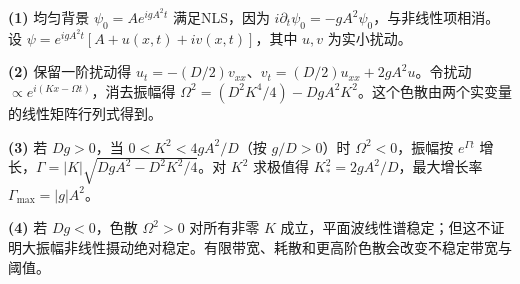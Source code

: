 \par\noindent\textbf{(1)} 均匀背景 \(\psi_0=Ae^{igA^2t}\) 满足NLS，因为 \(i\partial_t\psi_0=-gA^2\psi_0\)，与非线性项相消。设 \(\psi=e^{igA^2t}[A+u(x,t)+iv(x,t)]\)，其中 \(u,v\) 为实小扰动。
\par\noindent\textbf{(2)} 保留一阶扰动得 \(u_t=-(D/2)v_{xx}\)、\(v_t=(D/2)u_{xx}+2gA^2u\)。令扰动 \(\propto e^{i(Kx-\Omega t)}\)，消去振幅得 \(\Omega^2=(D^2K^4/4)-DgA^2K^2\)。这个色散由两个实变量的线性矩阵行列式得到。
\par\noindent\textbf{(3)} 若 \(Dg>0\)，当 \(0<K^2<4gA^2/D\)（按 \(g/D>0\)）时 \(\Omega^2<0\)，振幅按 \(e^{\Gamma t}\) 增长，\(\Gamma=|K|\sqrt{DgA^2-D^2K^2/4}\)。对 \(K^2\) 求极值得 \(K_*^2=2gA^2/D\)，最大增长率 \(\Gamma_{\max}=|g|A^2\)。
\par\noindent\textbf{(4)} 若 \(Dg<0\)，色散 \(\Omega^2>0\) 对所有非零 \(K\) 成立，平面波线性谱稳定；但这不证明大振幅非线性摄动绝对稳定。有限带宽、耗散和更高阶色散会改变不稳定带宽与阈值。
